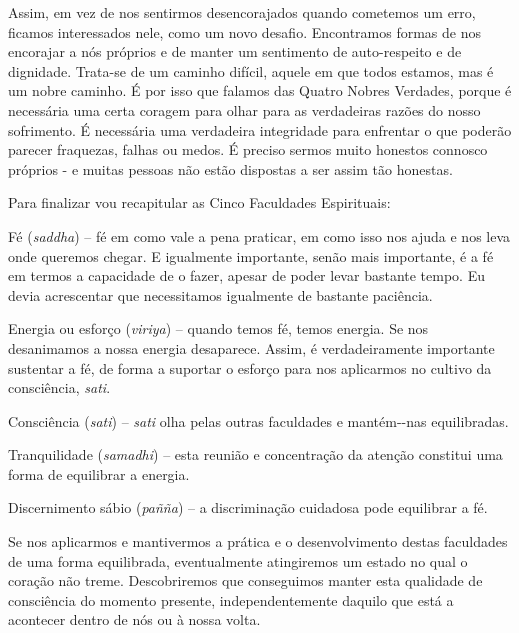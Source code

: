Assim, em vez de nos sentirmos desencorajados quando cometemos um erro,
ficamos interessados nele, como um novo desafio. Encontramos formas de
nos encorajar a nós próprios e de manter um sentimento de auto-respeito
e de dignidade. \mbox{Trata-se} de um caminho difícil, aquele em que todos
estamos, mas é um nobre caminho. É por isso que falamos das Quatro
Nobres Verdades, porque é necessária uma certa coragem para olhar para
as verdadeiras razões do nosso sofrimento. É necessária uma verdadeira
integridade para enfrentar o que poderão parecer fraquezas, falhas ou
medos. É preciso sermos muito honestos connosco próprios - e muitas
pessoas não estão dispostas a ser assim tão honestas.

Para finalizar vou recapitular as Cinco Faculdades Espirituais:

Fé (\emph{saddha}) -- fé em como vale a pena praticar, em como isso nos ajuda
e nos leva onde queremos chegar. E igualmente importante, senão mais
importante, é a fé em termos a capacidade de o fazer, apesar de poder levar
bastante tempo. Eu devia acrescentar que necessitamos igualmente de bastante
paciência.

Energia ou esforço (\emph{viriya}) -- quando temos fé, temos energia. Se nos
desanimamos a nossa energia desaparece. Assim, é verdadeiramente importante
sustentar a fé, de forma a suportar o esforço para nos aplicarmos no cultivo
da consciência, \emph{sati}.

Consciência (\emph{sati}) -- \emph{sati} olha pelas outras faculdades e
mantém-\linebreak-nas equilibradas.

Tranquilidade (\emph{samadhi}) -- esta reunião e concentração da atenção
constitui uma forma de equilibrar a energia.

Discernimento sábio (\emph{pañña}) -- a discriminação cuidadosa pode
equilibrar a fé.

Se nos aplicarmos e mantivermos a prática e o desenvolvimento destas
faculdades de uma forma equilibrada, eventualmente atingiremos um estado
no qual o coração não treme. Descobriremos que conseguimos manter esta
qualidade de consciência do momento presente, independentemente daquilo
que está a acontecer dentro de nós ou à nossa volta.

